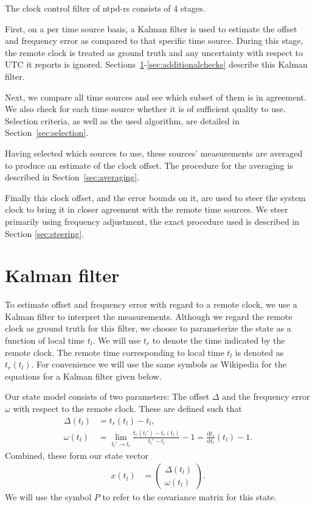 \documentclass{article}
\begin{document}
The clock control filter of ntpd-rs consists of 4 stages.

First, on a per time source basis, a Kalman filter is used to estimate the offset and frequency error as compared to that specific time source.
During this stage, the remote clock is treated as ground truth and any uncertainty with respect to UTC it reports is ignored.
Sections~\ref{sec:Kalmanfilter}-\ref{sec:additionalchecks} describe this Kalman filter.

Next, we compare all time sources and see which subset of them is in agreement.
We also check for each time source whether it is of sufficient quality to use.
Selection criteria, as well as the used algorithm, are detailed in Section~\ref{sec:selection}.

Having selected which sources to use, these sources' measurements are averaged to produce an estimate of the clock offset.
The procedure for the averaging is described in Section~\ref{sec:averaging}.

Finally this clock offset, and the error bounds on it, are used to steer the system clock to bring it in closer agreement with the remote time sources.
We steer primarily using frequency adjustment, the exact procedure used is described in Section \ref{sec:steering}.

\section{Kalman filter}\label{sec:Kalmanfilter}

To estimate offset and frequency error with regard to a remote clock, we use a Kalman filter to interpret the measurements.
Although we regard the remote clock as ground truth for this filter, we choose to parameterize the state as a function of local time $t_l$.
We will use $t_r$ to denote the time indicated by the remote clock.
The remote time corresponding to local time $t_l$ is denoted as $t_r(t_l)$.
For convenience we will use the same symbols as Wikipedia for the equations for a Kalman filter given below.

Our state model consists of two parameters: The offset $\Delta$ and the frequency error $\omega$ with respect to the remote clock. These are defined such that
\begin{align}
\Delta(t_l) &= t_r(t_l) - t_l, \\
\omega(t_l) &= \lim_{t_l' \rightarrow t_l}\frac{t_r(t_l') - t_r(t_l)}{t_l' - t_l} - 1 = \frac{\mathrm{d} t_r}{\mathrm{d} t_l}(t_l) - 1.
\end{align}
Combined, these form our state vector
\begin{align}
x(t_l) &= \begin{pmatrix}
\Delta(t_l)\\
\omega(t_l)
\end{pmatrix}.
\end{align}
We will use the symbol $P$ to refer to the covariance matrix for this state.
\end{document}
